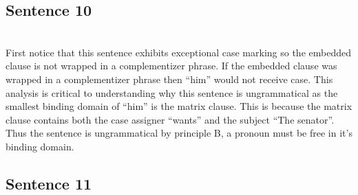 \documentclass[20pt]{article}
\newcommand{\feature}[1]{\ensuremath{\left[ \text{#1} \right]}}
\newcommand{\treeScale}[0]{0.7}
\begin{document}
\subsection*{Sentence 10}
 \\

First notice that this sentence exhibits exceptional case marking so the embedded clause is not wrapped in a
complementizer phrase. If the embedded clause was wrapped in a complementizer
phrase then ``him'' would not receive case. This analysis is critical to
understanding why this sentence is ungrammatical as the smallest binding domain
of ``him'' is the matrix clause. This is because the matrix clause contains both
the case assigner ``wants'' and the subject ``The senator''. Thus the sentence
is ungrammatical by principle B, a pronoun must be free in it's binding domain.
\subsection*{Sentence 11}
\end{document}
